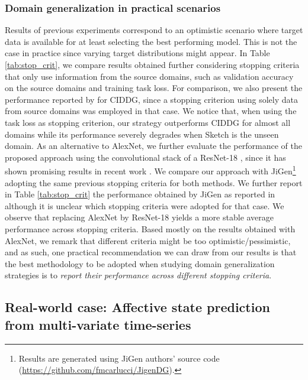 \documentclass{article}
\begin{document}
\subsubsection{Domain generalization in practical scenarios} Results of previous experiments correspond to an optimistic scenario where target data is available for at least selecting the best performing model. This is not the case in practice since varying target distributions might appear. In Table \ref{tab:stop_crit}, we compare results obtained further considering stopping criteria that only use information from the source domains, such as validation accuracy on the source domains and training task loss. For comparison, we also present the performance reported by \cite{li2018deep} for CIDDG, since a stopping criterion using solely data from source domains was employed in that case. We notice that, when using the task loss as stopping criterion, our strategy outperforms CIDDG for almost all domains while its performance severely degrades when Sketch is the unseen domain. As an alternative to AlexNet, we further evaluate the performance of the proposed approach using the convolutional stack of a ResNet-18 \cite{he2016deep}, since it has shown promising results in recent work \cite{carlucci2019domain}.
We compare our approach with JiGen\footnote{\label{fn:jigen}Results are generated using JiGen authors' source code (\url{https://github.com/fmcarlucci/JigenDG}).} adopting the same previous stopping criteria for both methods. We further report in Table \ref{tab:stop_crit} the performance obtained by JiGen as reported in \cite{carlucci2019domain} although it is unclear which stopping criteria were adopted for that case. We observe that replacing AlexNet by ResNet-18 yields a more stable average performance across stopping criteria. Based mostly on the results obtained with AlexNet, we remark that different criteria might be too optimistic/pessimistic, and as such, one practical recommendation we can draw from our results is that the best methodology to be adopted when studying domain generalization strategies is to \emph{report their performance across different stopping criteria}.
\subsection{Real-world case: Affective state prediction from multi-variate time-series}
\end{document}
